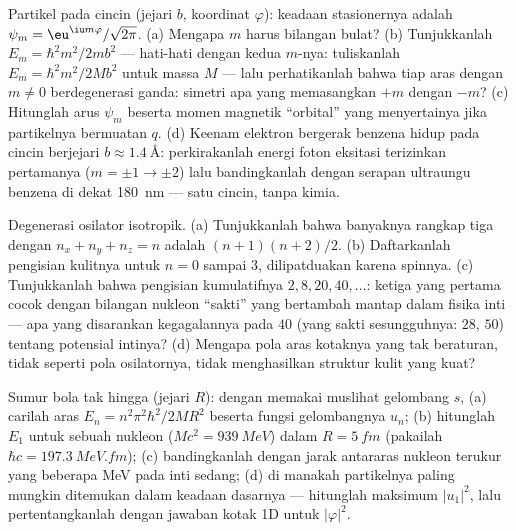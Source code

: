 \begin{exercise}[$\star\star$]\label{exo:b3:schrodinger-three-dimensions:5}
Partikel pada cincin (jejari $b$, koordinat $\varphi$): keadaan
stasionernya adalah $\psi_m = \eu^{\iu m\varphi}/\sqrt{2\pi}$. (a)
Mengapa $m$ harus bilangan bulat? (b) Tunjukkanlah $E_m = \hbar^2m^2/2mb^2$ ---
hati-hati dengan kedua $m$-nya: tuliskanlah $E_m = \hbar^2 m^2/2Mb^2$ untuk massa
$M$ --- lalu perhatikanlah bahwa tiap aras dengan $m \neq 0$ berdegenerasi ganda:
simetri apa yang memasangkan $+m$ dengan $-m$? (c) Hitunglah arus
$\psi_m$ beserta momen magnetik ``orbital'' yang menyertainya jika
partikelnya bermuatan $q$. (d) Keenam elektron bergerak benzena hidup
pada cincin berjejari $b \approx \qty{1.4}{\angstrom}$: perkirakanlah
energi foton eksitasi terizinkan pertamanya ($m = \pm1 \to \pm2$) lalu
bandingkanlah dengan serapan ultraungu benzena di dekat \qty{180}{nm} ---
satu cincin, tanpa kimia.
\end{exercise}

\begin{exercise}[$\star\star$]\label{exo:b3:schrodinger-three-dimensions:6}
Degenerasi osilator isotropik. (a) Tunjukkanlah bahwa banyaknya rangkap
tiga dengan $n_x + n_y + n_z = n$ adalah $(n+1)(n+2)/2$. (b)
Daftarkanlah pengisian kulitnya untuk $n = 0$ sampai $3$, dilipatduakan
karena spinnya. (c) Tunjukkanlah bahwa pengisian kumulatifnya $2, 8, 20, 40, \dots$:
ketiga yang pertama cocok dengan bilangan nukleon ``sakti'' yang
bertambah mantap dalam fisika inti --- apa yang disarankan kegagalannya
pada $40$ (yang sakti sesungguhnya: $28$, $50$) tentang potensial
intinya? (d) Mengapa pola aras kotaknya yang tak beraturan, tidak
seperti pola osilatornya, tidak menghasilkan struktur kulit yang kuat?
\end{exercise}

\begin{exercise}[$\star\star$]\label{exo:b3:schrodinger-three-dimensions:7}
Sumur bola tak hingga (jejari $R$): dengan memakai muslihat gelombang $s$,
(a) carilah aras $E_n = n^2\pi^2\hbar^2/2MR^2$ beserta fungsi gelombangnya
$u_n$; (b) hitunglah $E_1$ untuk sebuah nukleon ($Mc^2 =
\qty{939}{MeV}$) dalam $R = \qty{5}{fm}$ (pakailah $\hbar c =
\qty{197.3}{MeV.fm}$); (c) bandingkanlah dengan jarak antararas nukleon
terukur yang beberapa MeV pada inti sedang; (d) di manakah partikelnya
paling mungkin ditemukan dalam keadaan dasarnya --- hitunglah maksimum
$|u_1|^2$, lalu pertentangkanlah dengan jawaban kotak 1D untuk $|\varphi|^2$.
\end{exercise}

